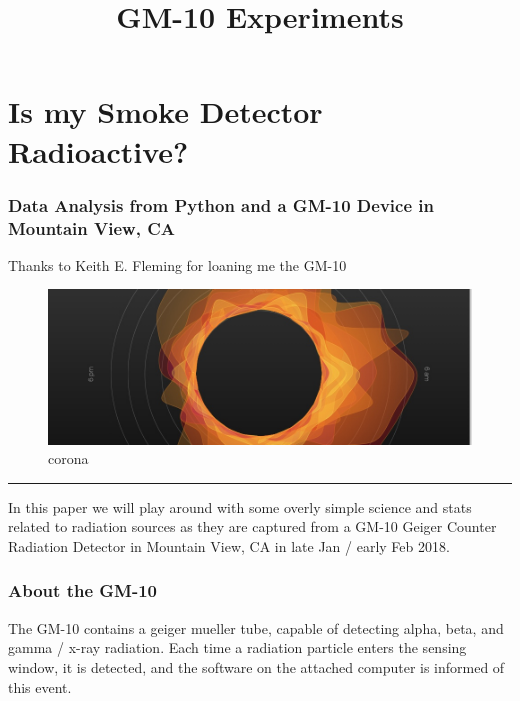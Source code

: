 \documentclass[11pt]{article}
\title{GM-10 Experiments}
\makeatletter
\def\maxwidth{\ifdim\Gin@nat@width>\linewidth\linewidth
    \else\Gin@nat@width\fi}
\let\Oldincludegraphics\includegraphics
\renewcommand{\includegraphics}[1]{\Oldincludegraphics[width=.8\maxwidth]{#1}}
\makeatother
\begin{document}
    
    
    \maketitle
    
    

    
    \section{Is my Smoke Detector
Radioactive?}\label{is-my-smoke-detector-radioactive}

\subsubsection{Data Analysis from Python and a GM-10 Device in Mountain
View,
CA}\label{data-analysis-from-python-and-a-gm-10-device-in-mountain-view-ca}

Thanks to Keith E. Fleming for loaning me the GM-10

\begin{figure}
\centering
\includegraphics{./corona.jpeg}
\caption{corona}
\end{figure}

\begin{center}\rule{0.5\linewidth}{\linethickness}\end{center}

    In this paper we will play around with some overly simple science and
stats related to radiation sources as they are captured from a GM-10
Geiger Counter Radiation Detector in Mountain View, CA in late Jan /
early Feb 2018.

\subsubsection{About the GM-10}\label{about-the-gm-10}

The GM-10 contains a geiger mueller tube, capable of detecting alpha,
beta, and gamma / x-ray radiation. Each time a radiation particle enters
the sensing window, it is detected, and the software on the attached
computer is informed of this event.
\end{document}
